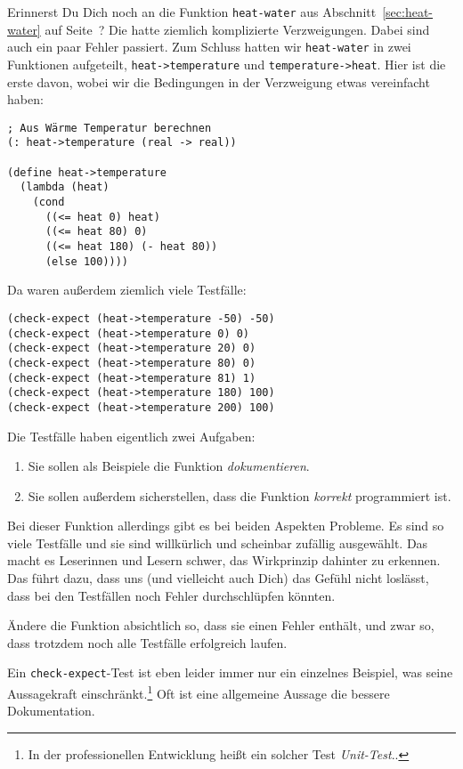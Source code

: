 %
Erinnerst Du Dich noch an die Funktion \lstinline{heat-water} aus
Abschnitt~\ref{sec:heat-water} auf Seite~\pageref{sec:heat-water}?
Die hatte ziemlich komplizierte Verzweigungen.  Dabei sind auch ein
paar Fehler passiert.  Zum Schluss hatten wir \lstinline{heat-water}
in zwei Funktionen aufgeteilt, \lstinline{heat->temperature} und
\lstinline{temperature->heat}.  Hier ist die erste davon, wobei wir
die Bedingungen in der Verzweigung etwas vereinfacht haben:
%
\begin{lstlisting}
; Aus Wärme Temperatur berechnen
(: heat->temperature (real -> real))

(define heat->temperature
  (lambda (heat)
    (cond
      ((<= heat 0) heat)
      ((<= heat 80) 0)
      ((<= heat 180) (- heat 80))
      (else 100))))
\end{lstlisting}
%
Da waren außerdem ziemlich viele Testfälle:
%
\begin{lstlisting}
(check-expect (heat->temperature -50) -50)
(check-expect (heat->temperature 0) 0)
(check-expect (heat->temperature 20) 0)
(check-expect (heat->temperature 80) 0)
(check-expect (heat->temperature 81) 1)
(check-expect (heat->temperature 180) 100)
(check-expect (heat->temperature 200) 100)                                            
\end{lstlisting}
%
Die Testfälle haben eigentlich zwei Aufgaben:
%
\begin{enumerate}
\item Sie sollen als Beispiele die Funktion \emph{dokumentieren}.
\item Sie sollen außerdem sicherstellen, dass die Funktion
  \emph{korrekt} programmiert ist.
\end{enumerate}
%
Bei dieser Funktion allerdings gibt es bei beiden Aspekten Probleme.
Es sind so viele Testfälle und sie sind willkürlich und scheinbar
zufällig ausgewählt.  Das macht es Leserinnen und Lesern schwer, das
Wirkprinzip dahinter zu erkennen. Das führt dazu, dass uns (und
vielleicht auch Dich) das Gefühl nicht loslässt, dass bei den
Testfällen noch Fehler durchschlüpfen könnten.
%
\begin{aufgabeinline}
  Ändere die Funktion absichtlich so, dass sie einen Fehler enthält,
  und zwar so, dass trotzdem noch alle Testfälle erfolgreich laufen.  
\end{aufgabeinline}
%
Ein \lstinline{check-expect}-Test ist eben leider immer nur ein
einzelnes Beispiel, was seine Aussagekraft einschränkt.\footnote{In
  der professionellen Entwicklung heißt ein solcher Test
  \textit{Unit-Test}..}  Oft ist eine allgemeine
Aussage die bessere Dokumentation.

